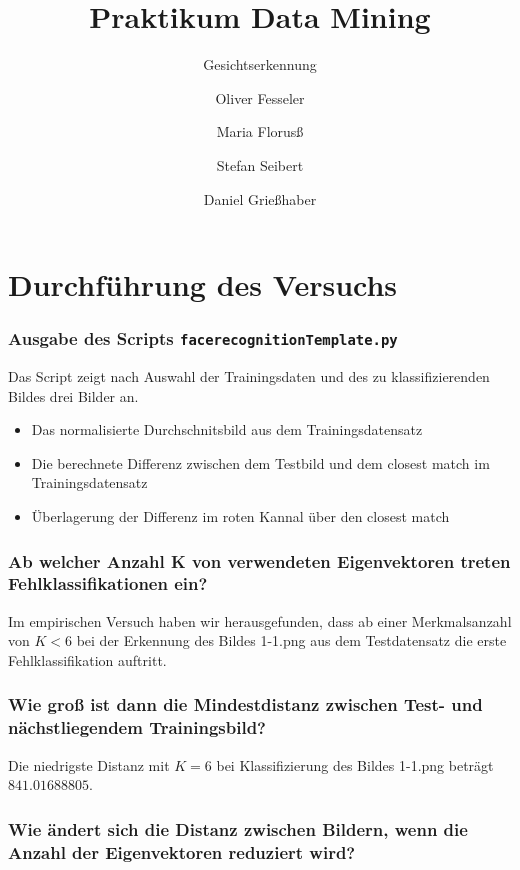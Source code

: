 \documentclass[12pt,a4paper]{scrartcl}
\begin{document}
\title{Praktikum Data Mining}
\subtitle{Gesichtserkennung}
\author{Oliver Fesseler \and Maria Florus\ss \and Stefan Seibert \and  Daniel Grie\ss haber}
\maketitle
\newpage

\part*{Durchf\"uhrung des Versuchs}

\section*{Ausgabe des Scripts \lstinline|facerecognitionTemplate.py|}
Das Script zeigt nach Auswahl der Trainingsdaten und des zu klassifizierenden Bildes drei Bilder an. 
\begin{itemize}
\item Das normalisierte Durchschnitsbild aus dem Trainingsdatensatz 
\item Die berechnete Differenz zwischen dem Testbild und dem closest match im Trainingsdatensatz
\item Überlagerung der Differenz im roten Kannal über den closest match
\end{itemize}

\section*{Ab welcher Anzahl K von verwendeten Eigenvektoren treten Fehlklassifikationen ein?}
Im empirischen Versuch haben wir herausgefunden, dass ab einer Merkmalsanzahl von $K < 6$ bei der Erkennung des Bildes 1-1.png aus dem Testdatensatz die erste Fehlklassifikation auftritt.

\section*{Wie gro{\ss} ist dann die Mindestdistanz zwischen Test- und nächstliegendem Trainingsbild?}
Die niedrigste Distanz mit $K=6$ bei Klassifizierung des Bildes 1-1.png beträgt $841.01688805$.

\section*{Wie ändert sich die Distanz zwischen Bildern, wenn die Anzahl der Eigenvektoren reduziert wird?}
\end{document}
